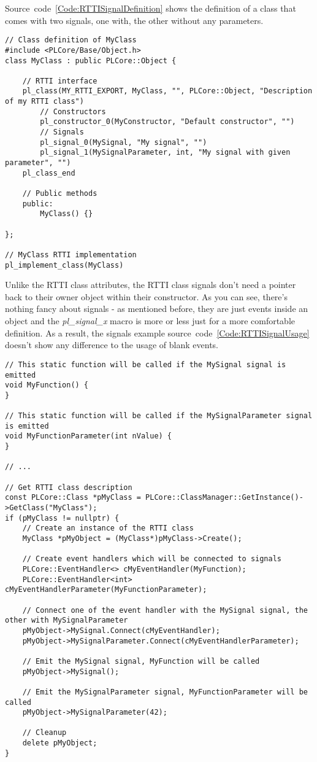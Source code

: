 Source~code~\ref{Code:RTTISignalDefinition} shows the definition of a class that comes with two signals, one with, the other without any parameters.
\begin{lstlisting}[label=Code:RTTISignalDefinition,caption={Defining a RTTI class with signals}]
// Class definition of MyClass
#include <PLCore/Base/Object.h>
class MyClass : public PLCore::Object {

	// RTTI interface
	pl_class(MY_RTTI_EXPORT, MyClass, "", PLCore::Object, "Description of my RTTI class")
		// Constructors
		pl_constructor_0(MyConstructor, "Default constructor", "")
		// Signals
		pl_signal_0(MySignal, "My signal", "")
		pl_signal_1(MySignalParameter, int, "My signal with given parameter", "")
	pl_class_end

	// Public methods
	public:
		MyClass() {}

};

// MyClass RTTI implementation
pl_implement_class(MyClass)
\end{lstlisting}
Unlike the RTTI class attributes, the RTTI class signals don't need a pointer back to their owner object within their constructor. As you can see, there's nothing fancy about signals - as mentioned before, they are just events inside an object and the \emph{pl\_signal\_x} macro is more or less just for a more comfortable definition. As a result, the signals example source~code~\ref{Code:RTTISignalUsage} doesn't show any difference to the usage of blank events.
\begin{lstlisting}[label=Code:RTTISignalUsage,caption={Using signals of a RTTI class}]
// This static function will be called if the MySignal signal is emitted
void MyFunction() {
}

// This static function will be called if the MySignalParameter signal is emitted
void MyFunctionParameter(int nValue) {
}

// ...

// Get RTTI class description
const PLCore::Class *pMyClass = PLCore::ClassManager::GetInstance()->GetClass("MyClass");
if (pMyClass != nullptr) {
	// Create an instance of the RTTI class
	MyClass *pMyObject = (MyClass*)pMyClass->Create();

	// Create event handlers which will be connected to signals
	PLCore::EventHandler<> cMyEventHandler(MyFunction);
	PLCore::EventHandler<int> cMyEventHandlerParameter(MyFunctionParameter);

	// Connect one of the event handler with the MySignal signal, the other with MySignalParameter
	pMyObject->MySignal.Connect(cMyEventHandler);
	pMyObject->MySignalParameter.Connect(cMyEventHandlerParameter);

	// Emit the MySignal signal, MyFunction will be called
	pMyObject->MySignal();

	// Emit the MySignalParameter signal, MyFunctionParameter will be called
	pMyObject->MySignalParameter(42);

	// Cleanup
	delete pMyObject;
}
\end{lstlisting}
